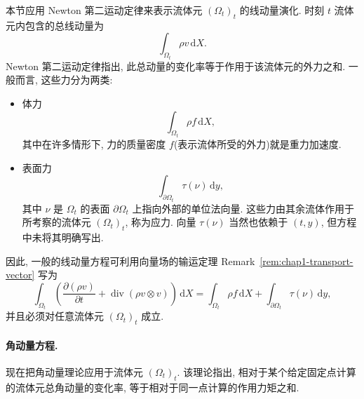 本节应用 Newton 第二运动定律来表示流体元 $(\Omega_t)_t$ 的线动量演化. 时刻 $t$ 流体元内包含的总线动量为
\[
  \int_{\Omega_t}\rho v\,\mathrm{d}X.
\]
Newton 第二运动定律指出, 此总动量的变化率等于作用于该流体元的外力之和. 一般而言, 这些力分为两类:
\begin{itemize}
\item 体力
\[
  \int_{\Omega_t}\rho f\,\mathrm{d}X,
\]
其中在许多情形下, 力的质量密度 $f$(表示流体所受的外力)就是重力加速度.
\item 表面力
\[
  \int_{\partial\Omega_t}\tau(\nu)\,\mathrm{d}y,
\]
其中 $\nu$ 是 $\Omega_t$ 的表面 $\partial\Omega_t$ 上指向外部的单位法向量. 这些力由其余流体作用于所考察的流体元 $(\Omega_t)_t$, 称为应力. 向量 $\tau(\nu)$ 当然也依赖于 $(t,y)$, 但方程中未将其明确写出.
\end{itemize}
因此, 一般的线动量方程可利用向量场的输运定理 Remark~\ref{rem:chap1-transport-vector} 写为
\begin{equation}
\label{eq:chap1-linear-momentum-integral}
  \int_{\Omega_t}\left(\frac{\partial(\rho v)}{\partial t}+\operatorname{div}(\rho v\otimes v)\right)\,\mathrm{d}X
  =\int_{\Omega_t}\rho f\,\mathrm{d}X+\int_{\partial\Omega_t}\tau(\nu)\,\mathrm{d}y,
\end{equation}
并且必须对任意流体元 $(\Omega_t)_t$ 成立.

\paragraph{角动量方程.}
\label{subsec:chap1-angular-momentum}

现在把角动量理论应用于流体元 $(\Omega_t)_t$. 该理论指出, 相对于某个给定固定点计算的流体元总角动量的变化率, 等于相对于同一点计算的作用力矩之和.


